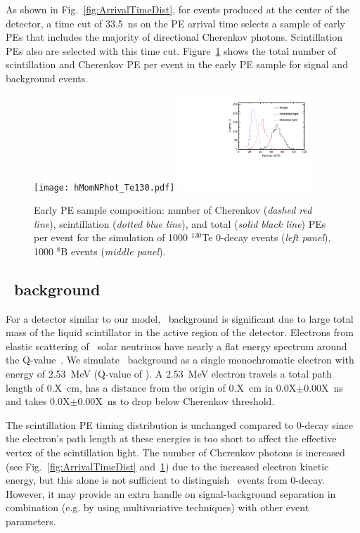 As shown in Fig.~\ref{fig:ArrivalTimeDist}, for events produced at the center of the detector, a time cut of 33.5~ns on the PE arrival 
time selects a sample of early PEs that includes the majority of directional Cherenkov photons. Scintillation PEs also are 
selected with this time cut. Figure~\ref{fig:NPhotDist} shows the total number of scintillation and Cherenkov PE per event in the early 
PE sample for signal and background events.



\begin{figure}[ht]
  \centering
  \texttt{[image: hMomNPhot\_Te130.pdf]}
  \includegraphics[width=0.45\textwidth]{hMomNPhot_1el_2p529MeV.pdf}
  \caption{Early PE sample composition: number of Cherenkov (\emph{dashed red line}), scintillation
    (\emph{dotted blue line}), and total (\emph{solid black line}) PEs per event
    for the simulation of 1000 $^{130}$Te 0\nbb-decay events (\emph{left panel}),
    1000 $^8$B events (\emph{middle panel}).}%
\label{fig:NPhotDist}
\end{figure}



\subsection{\B~background}

For a detector similar to our model, \B~background is significant due to large total mass of the liquid scintillator in
the active region of the detector.
Electrons from elastic scattering of \B~solar neutrinos have nearly a flat energy spectrum around the 
Q-value~\cite{SNOp-B8-bkg}. We simulate \B~background as a single monochromatic electron with energy of 2.53~MeV 
(Q-value of \Te). A 2.53~MeV electron travels a total path length of 0.X~cm, has a distance from the origin of 0.X~cm in 
0.0X$\pm$0.00X~ns  and takes 0.0X$\pm$0.00X~ns to drop below Cherenkov threshold.

The scintillation PE timing distribution is unchanged compared to 0\nbb-decay since the electron's path length at these energies 
is too short to affect the effective vertex of the scintillation light. The number of Cherenkov photons is increased 
(see Fig.~\ref{fig:ArrivalTimeDist} and~\ref{fig:NPhotDist}) due to the increased electron kinetic energy, but this alone is not 
sufficient to distinguish \B~events from 0\nbb-decay. However, it may provide an extra handle on signal-background separation in 
combination (e.g. by using multivariative techniques) with other event parameters.

